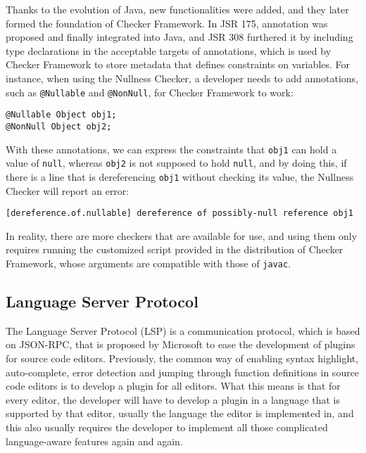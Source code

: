 \documentclass{article}
\begin{document}
Thanks to the evolution of Java, new functionalities were added, and they later
formed the foundation of Checker Framework. In JSR 175\cite{jsr175}, annotation
was proposed and finally integrated into Java, and JSR 308\cite{jsr308}
furthered it by including type declarations in the acceptable targets of
annotations, which is used by Checker Framework to store metadata that defines
constraints on variables. For instance, when using the Nullness Checker, a
developer needs to add annotations, such as \verb|@Nullable| and
\verb|@NonNull|, for Checker Framework to work:

\begin{lstlisting}
@Nullable Object obj1;
@NonNull Object obj2;    
\end{lstlisting}

With these annotations, we can express the constraints that \verb|obj1| can hold
a value of \verb|null|, whereas \verb|obj2| is not supposed to hold \verb|null|,
and by doing this, if there is a line that is dereferencing \verb|obj1| without
checking its value, the Nullness Checker will report an error:

\begin{lstlisting}
[dereference.of.nullable] dereference of possibly-null reference obj1
\end{lstlisting}

In reality, there are more checkers that are available for use, and using them
only requires running the customized script provided in the distribution of
Checker Framework, whose arguments are compatible with those of \verb|javac|.

\subsection{Language Server Protocol}

The Language Server Protocol (LSP) is a communication protocol, which is based
on JSON-RPC, that is proposed by Microsoft to ease the development of plugins
for source code editors. Previously, the common way of enabling syntax
highlight, auto-complete, error detection and jumping through function
definitions in source code editors is to develop a plugin for all editors. What
this means is that for every editor, the developer will have to develop a plugin
in a language that is supported by that editor, usually the language the editor
is implemented in, and this also usually requires the developer to implement all
those complicated language-aware features again and again.
\end{document}
